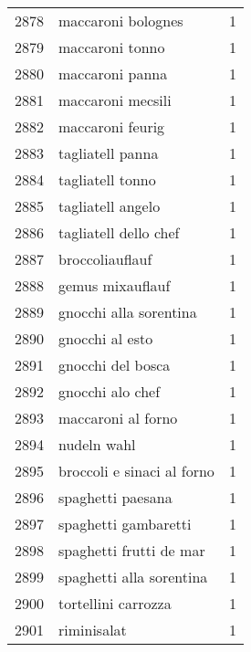 \begin{tabular}{llr}
2878 &                                 maccaroni bolognes &      1 \\
2879 &                                    maccaroni tonno &      1 \\
2880 &                                    maccaroni panna &      1 \\
2881 &                                  maccaroni mecsili &      1 \\
2882 &                                   maccaroni feurig &      1 \\
2883 &                                   tagliatell panna &      1 \\
2884 &                                   tagliatell tonno &      1 \\
2885 &                                  tagliatell angelo &      1 \\
2886 &                              tagliatell dello chef &      1 \\
2887 &                                    broccoliauflauf &      1 \\
2888 &                                   gemus mixauflauf &      1 \\
2889 &                             gnocchi alla sorentina &      1 \\
2890 &                                    gnocchi al esto &      1 \\
2891 &                                  gnocchi del bosca &      1 \\
2892 &                                   gnocchi alo chef &      1 \\
2893 &                                 maccaroni al forno &      1 \\
2894 &                                        nudeln wahl &      1 \\
2895 &                         broccoli e sinaci al forno &      1 \\
2896 &                                  spaghetti paesana &      1 \\
2897 &                               spaghetti gambaretti &      1 \\
2898 &                            spaghetti frutti de mar &      1 \\
2899 &                           spaghetti alla sorentina &      1 \\
2900 &                                tortellini carrozza &      1 \\
2901 &                                        riminisalat &      1 \\

\end{tabular}
